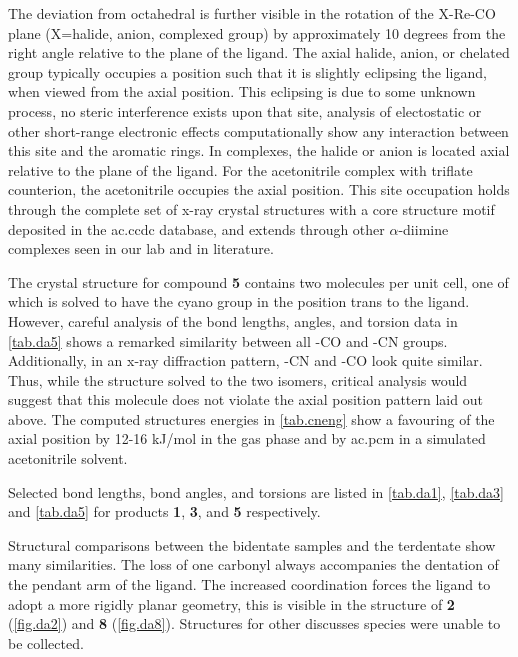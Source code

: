 The deviation from octahedral is further visible in the rotation of the X-Re-CO plane (X=halide, anion, complexed group) by approximately 10 degrees from the right angle relative to the plane of the ligand. The axial halide, anion, or chelated group typically occupies a position such that it is slightly eclipsing the ligand, when viewed from the axial position. This eclipsing is due to some unknown process, no steric interference exists upon that site, analysis of electostatic or other short-range electronic effects computationally show any interaction between this site and the aromatic rings. In  complexes, the halide or anion is located axial relative to the plane of the ligand. For the acetonitrile complex with triflate counterion, the acetonitrile occupies the axial position. This site occupation holds through the complete set of x-ray crystal structures with a  core structure motif deposited in the \gls{ac.ccdc} database\autocite{allen2002}, and extends through other $\alpha$-diimine complexes seen in our lab and in literature\autocite{jurca2013}. 

The crystal structure for compound \textbf{5} contains two molecules per unit cell, one of which is solved to have the cyano group in the position trans to the ligand. However, careful analysis of the bond lengths, angles, and torsion data in \autoref{tab.da5} shows a remarked similarity between all -CO and -CN groups. Additionally, in an x-ray diffraction pattern, -CN and -CO look quite similar. Thus, while the structure solved to the two isomers, critical analysis would suggest that this molecule does not violate the axial position pattern laid out above. The computed structures energies in \autoref{tab.cneng} show a favouring of the axial position by 12-16 kJ/mol in the gas phase and by \gls{ac.pcm} in a simulated acetonitrile solvent. 



Selected bond lengths, bond angles, and torsions are listed in \autoref{tab.da1}, \autoref{tab.da3} and \autoref{tab.da5} for products \textbf{1}, \textbf{3}, and \textbf{5} respectively.






\FloatBarrier

Structural comparisons between the bidentate samples and the terdentate show many similarities. The loss of one carbonyl always accompanies the dentation of the pendant arm of the ligand. The increased coordination forces the ligand to adopt a more rigidly planar geometry, this is visible in the structure of \textbf{2} (\autoref{fig.da2}) and \textbf{8} (\autoref{fig.da8}). Structures for other discusses species were unable to be collected.

